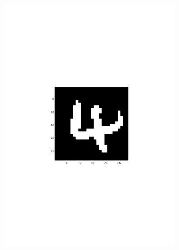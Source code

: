 \documentclass[paper=a4, fontsize=10pt]{scrartcl} %
\numberwithin{equation}{section} %
\numberwithin{figure}{section} %
\numberwithin{table}{section} %
\begin{document}
\begin{figure}[H]
\begin{subfigure}[b]{0.3\textwidth}
        \end{subfigure}%
        ~ %
        \begin{subfigure}[b]{0.3\textwidth}
                \includegraphics[width=\textwidth]{error_2}
        \end{subfigure}
        ~ %
        \begin{subfigure}[b]{0.3\textwidth}

\end{subfigure}
\end{figure}
\end{document}
